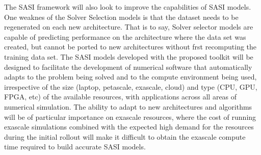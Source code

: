 The SASI framework will also look to improve the capabilities of SASI models. One weaknes of the Solver Selection models is that the dataset needs to be regenerated on each new architecture. That is to say, Solver selector models are capable of predicting performance on the architecture where the data set was created, but cannot be ported to new architectures without frst recomputing the training data set.  The SASI models developed with the proposed toolkit will be designed to facilitate the development of numerical software that automatically adapts to the problem being solved and to the compute environment being used, irrespective of the size (laptop, petascale, exascale, cloud) and type (CPU, GPU, FPGA, etc) of the available resources, with applications across all areas of numerical simulation. The ability to adapt to new architectures and algorithms will be of particular importance on exascale resources, where the cost of running exascale simulations combined with the expected high demand for the resources during the initial rollout will make it difficult to obtain the exascale compute time required to build accurate SASI models. 

